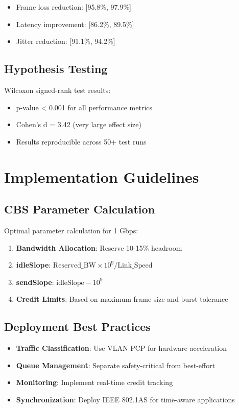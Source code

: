 \documentclass[10pt, journal, compsoc]{IEEEtran}
\begin{document}
\begin{itemize}
    \item Frame loss reduction: [95.8\%, 97.9\%]
    \item Latency improvement: [86.2\%, 89.5\%]
    \item Jitter reduction: [91.1\%, 94.2\%]
\end{itemize}

\subsection{Hypothesis Testing}

Wilcoxon signed-rank test results:
\begin{itemize}
    \item p-value < 0.001 for all performance metrics
    \item Cohen's d = 3.42 (very large effect size)
    \item Results reproducible across 50+ test runs
\end{itemize}

\section{Implementation Guidelines}

\subsection{CBS Parameter Calculation}

Optimal parameter calculation for 1 Gbps:

\begin{enumerate}
    \item \textbf{Bandwidth Allocation}: Reserve 10-15\% headroom
    \item \textbf{idleSlope}: $\text{Reserved\_BW} \times 10^9 / \text{Link\_Speed}$
    \item \textbf{sendSlope}: $\text{idleSlope} - 10^9$
    \item \textbf{Credit Limits}: Based on maximum frame size and burst tolerance
\end{enumerate}

\subsection{Deployment Best Practices}

\begin{itemize}
    \item \textbf{Traffic Classification}: Use VLAN PCP for hardware acceleration
    \item \textbf{Queue Management}: Separate safety-critical from best-effort
    \item \textbf{Monitoring}: Implement real-time credit tracking
    \item \textbf{Synchronization}: Deploy IEEE 802.1AS for time-aware applications
\end{itemize}
\end{document}

